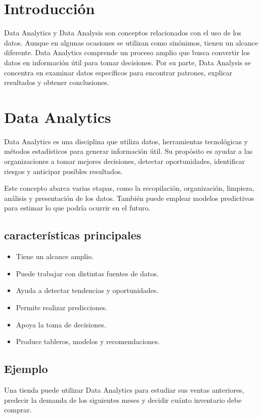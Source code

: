 
\section{Introducción}
Data Analytics y Data Analysis son conceptos relacionados con el uso de los
datos. Aunque en algunas ocasiones se utilizan como sinónimos, tienen un
alcance diferente. Data Analytics comprende un proceso amplio que busca
convertir los datos en información útil para tomar decisiones. Por su parte,
Data Analysis se concentra en examinar datos específicos para encontrar
patrones, explicar resultados y obtener conclusiones.

\section{Data Analytics}
Data Analytics es una disciplina que utiliza datos, herramientas tecnológicas
y métodos estadísticos para generar información útil. Su propósito es ayudar
a las organizaciones a tomar mejores decisiones, detectar oportunidades,
identificar riesgos y anticipar posibles resultados.

Este concepto abarca varias etapas, como la recopilación, organización,
limpieza, análisis y presentación de los datos. También puede emplear modelos
predictivos para estimar lo que podría ocurrir en el futuro.

\subsection{características principales}

\begin{itemize}
    \item Tiene un alcance amplio.
    \item Puede trabajar con distintas fuentes de datos.
    \item Ayuda a detectar tendencias y oportunidades.
    \item Permite realizar predicciones.
    \item Apoya la toma de decisiones.
    \item Produce tableros, modelos y recomendaciones.
\end{itemize}

\subsection{Ejemplo}
Una tienda puede utilizar Data Analytics para estudiar sus ventas anteriores,
predecir la demanda de los siguientes meses y decidir cuánto inventario debe
comprar.

